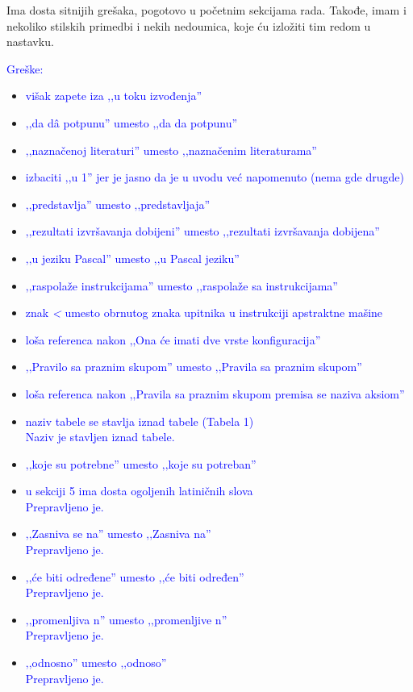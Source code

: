 \documentclass[a4paper]{report}
\newcommand{\odgovor}[1]{\textcolor{blue}{#1}}
\begin{document}
{Ima dosta sitnijih grešaka, pogotovo u početnim sekcijama rada. Takođe, imam i nekoliko stilskih primedbi i nekih nedoumica, koje ću izložiti tim redom u nastavku.}

\odgovor{Greške:}
\begin{itemize}
	\item \odgovor{višak zapete iza ‚‚u toku izvođenja''}
	\item \odgovor{‚‚da d\^{a} potpunu'' umesto ‚‚da da potpunu''}
	\item \odgovor{‚‚naznačenoj literaturi'' umesto ‚‚naznačenim literaturama''}
	\item \odgovor{izbaciti ‚‚u 1'' jer je jasno da je u uvodu već napomenuto (nema gde drugde)}
	\item \odgovor{‚‚predstavlja'' umesto ‚‚predstavljaja''}
	\item \odgovor{‚‚rezultati izvršavanja dobijeni'' umesto ‚‚rezultati izvršavanja dobijena''}
	\item \odgovor{‚‚u jeziku Pascal'' umesto ‚‚u Pascal jeziku''}
	\item \odgovor{‚‚raspolaže instrukcijama'' umesto ‚‚raspolaže sa instrukcijama''}
	\item \odgovor{znak \textit{<} umesto obrnutog znaka upitnika u instrukciji apstraktne mašine}
	\item \odgovor{loša referenca nakon ‚‚Ona će imati dve vrste konfiguracija''}
	\item \odgovor{‚‚Pravilo sa praznim skupom'' umesto ‚‚Pravila sa praznim skupom''}
	\item \odgovor{loša referenca nakon ‚‚Pravila sa praznim skupom premisa se naziva aksiom''}
	\item \odgovor{naziv tabele se stavlja iznad tabele (Tabela 1)\\
	Naziv je stavljen iznad tabele.}
	\item \odgovor{‚‚koje su potrebne'' umesto ‚‚koje su potreban''}
	\item \odgovor{u sekciji 5 ima dosta ogoljenih latiničnih slova \\
	Prepravljeno je.}
	\item \odgovor{‚‚Zasniva se na'' umesto ‚‚Zasniva na'' \\
	Prepravljeno je. }
	\item \odgovor{‚‚će biti određene'' umesto ‚‚će biti određen'' \\
	Prepravljeno je. }
	\item \odgovor{‚‚promenljiva n'' umesto ‚‚promenljive n'' \\
	Prepravljeno je. }
	\item \odgovor{‚‚odnosno'' umesto ‚‚odnoso'' \\
	Prepravljeno je. }
\end{itemize}
\end{document}
